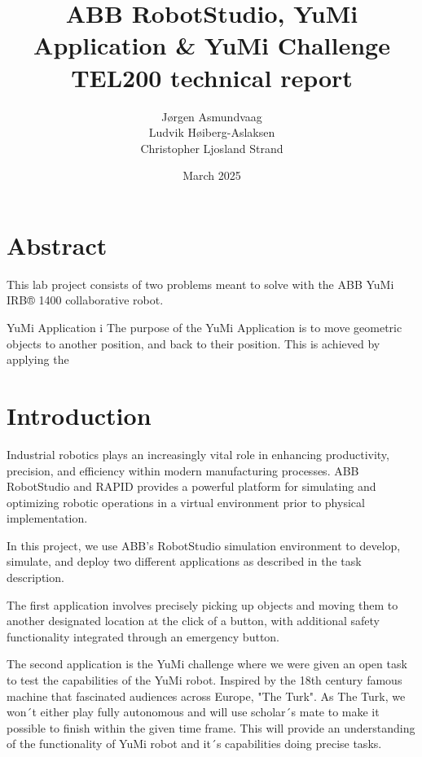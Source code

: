 \documentclass[a4paper,12pt]{article}
\begin{document}
\begin{titlepage}
    \centering
    \vfill
    
    \title{ABB RobotStudio, YuMi Application \& YuMi Challenge \\ \large TEL200 technical report}
    \author{J\o rgen Asmundvaag \\ Ludvik H\o iberg-Aslaksen \\ Christopher Ljosland Strand}
    \date{March 2025}
    \maketitle
    
    \vfill
\end{titlepage}


\newpage
\tableofcontents

\newpage
\section{Abstract}
This lab project consists of two problems meant to solve with the ABB YuMi IRB® 1400 collaborative robot. 

YuMi Application i
The purpose of the YuMi Application is to move geometric objects to another position, and back to their position. This is achieved by applying the 

\section{Introduction}
Industrial robotics plays an increasingly vital role in enhancing productivity, precision, and efficiency within modern manufacturing processes. ABB RobotStudio and RAPID provides a powerful platform for simulating and optimizing robotic operations in a virtual environment prior to physical implementation.

In this project, we use ABB's RobotStudio simulation environment to develop, simulate, and deploy two different applications as described in the task description. 

The first application involves precisely picking up objects and moving them to another designated location at the click of a button, with additional safety functionality integrated through an emergency button.

The second application is the YuMi challenge where we were given an open task to test the capabilities of the YuMi robot. Inspired by the 18th century famous machine that fascinated audiences across Europe, "The Turk". As The Turk, we won´t either play fully autonomous and will use scholar´s mate to make it possible to finish within the given time frame. This  will provide an understanding of the functionality of YuMi robot and it´s capabilities doing precise tasks.
\end{document}
